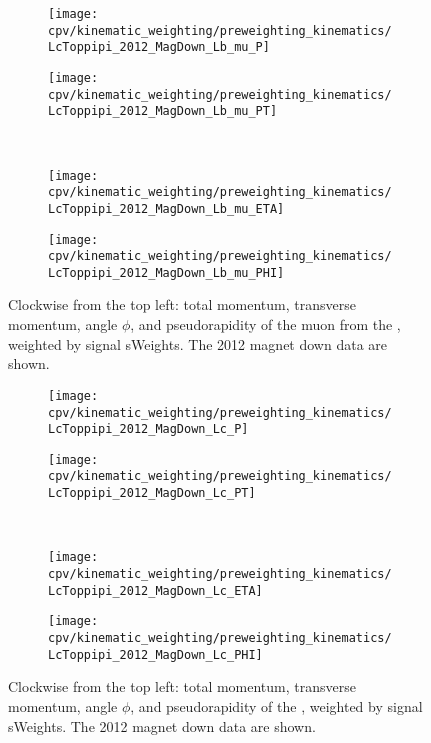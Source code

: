 \begin{figure}
  \begin{subfigure}[b]{0.4\textwidth}
    \texttt{[image: cpv/kinematic\_weighting/preweighting\_kinematics/LcToppipi\_2012\_MagDown\_Lb\_mu\_P]}
    \label{fig:cpv:kinematic_weighting:pre:Lb_mu:P}
  \end{subfigure}
  \begin{subfigure}[b]{0.4\textwidth}
    \texttt{[image: cpv/kinematic\_weighting/preweighting\_kinematics/LcToppipi\_2012\_MagDown\_Lb\_mu\_PT]}
    \label{fig:cpv:kinematic_weighting:pre:Lb_mu:PT}
  \end{subfigure}\\
  \begin{subfigure}[b]{0.4\textwidth}
    \texttt{[image: cpv/kinematic\_weighting/preweighting\_kinematics/LcToppipi\_2012\_MagDown\_Lb\_mu\_ETA]}
    \label{fig:cpv:kinematic_weighting:pre:Lb_mu:ETA}
  \end{subfigure}
  \begin{subfigure}[b]{0.4\textwidth}
    \texttt{[image: cpv/kinematic\_weighting/preweighting\_kinematics/LcToppipi\_2012\_MagDown\_Lb\_mu\_PHI]}
    \label{fig:cpv:kinematic_weighting:pre:Lb_mu:PHI}
  \end{subfigure}
  \caption{%
    Clockwise from the top left: total momentum, transverse momentum, angle
    $\phi$, and pseudorapidity of the muon from the \PLambdab, weighted by
    signal sWeights.
    The 2012 magnet down data are shown.
  }
  \label{fig:cpv:kinematic_weighting:pre:Lb_mu}
\end{figure}

\begin{figure}
  \begin{subfigure}[b]{0.4\textwidth}
    \texttt{[image: cpv/kinematic\_weighting/preweighting\_kinematics/LcToppipi\_2012\_MagDown\_Lc\_P]}
    \label{fig:cpv:kinematic_weighting:pre:Lc:P}
  \end{subfigure}
  \begin{subfigure}[b]{0.4\textwidth}
    \texttt{[image: cpv/kinematic\_weighting/preweighting\_kinematics/LcToppipi\_2012\_MagDown\_Lc\_PT]}
    \label{fig:cpv:kinematic_weighting:pre:Lc:PT}
  \end{subfigure}\\
  \begin{subfigure}[b]{0.4\textwidth}
    \texttt{[image: cpv/kinematic\_weighting/preweighting\_kinematics/LcToppipi\_2012\_MagDown\_Lc\_ETA]}
    \label{fig:cpv:kinematic_weighting:pre:Lc:ETA}
  \end{subfigure}
  \begin{subfigure}[b]{0.4\textwidth}
    \texttt{[image: cpv/kinematic\_weighting/preweighting\_kinematics/LcToppipi\_2012\_MagDown\_Lc\_PHI]}
    \label{fig:cpv:kinematic_weighting:pre:Lc:PHI}
  \end{subfigure}
  \caption{%
    Clockwise from the top left: total momentum, transverse momentum, angle
    $\phi$, and pseudorapidity of the \PLambdac, weighted by signal sWeights.
    The 2012 magnet down data are shown.
  }
  \label{fig:cpv:kinematic_weighting:pre:Lc}
\end{figure}

